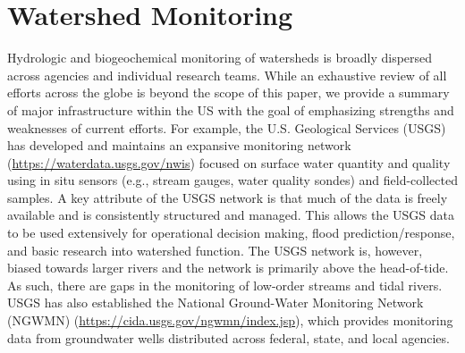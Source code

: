 \documentclass[preprint,review, 12pt]{elsarticle}
\begin{document}
\section{Watershed Monitoring}
  \begin{sloppypar}          
Hydrologic and biogeochemical monitoring of watersheds is broadly dispersed across agencies and individual research teams. While an exhaustive review of all efforts across the globe is beyond the scope of this paper, we provide a summary of major infrastructure within the US with the goal of emphasizing strengths and weaknesses of current efforts. For example, the U.S. Geological Services (USGS) has developed and maintains an expansive monitoring network (\url{https://waterdata.usgs.gov/nwis}) focused on surface water quantity and quality using in situ sensors (e.g., stream gauges, water quality sondes) and field-collected samples. A key attribute of the USGS network is that much of the data is freely available and is consistently structured and managed. This allows the USGS data to be used extensively for operational decision making, flood prediction/response, and basic research into watershed function. The USGS network is, however, biased towards larger rivers and the network is primarily above the head-of-tide. As such, there are gaps in the monitoring of low-order streams and tidal rivers. USGS has also established the National Ground-Water Monitoring Network (NGWMN) (\url{https://cida.usgs.gov/ngwmn/index.jsp}), which provides monitoring data from groundwater wells distributed across federal, state, and local agencies. 


\end{sloppypar}
\end{document}
